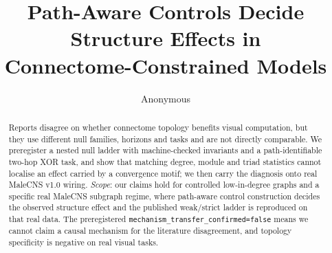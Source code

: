 \documentclass[10pt,twocolumn,letterpaper]{article}
\title{Path-Aware Controls Decide Structure Effects in\\ Connectome-Constrained Models}
\author{Anonymous}
\begin{document}
\maketitle

\begin{abstract}
Reports disagree on whether connectome topology benefits visual computation,
but they use different null families, horizons and tasks and are not directly
comparable. We preregister a nested null ladder with machine-checked invariants
and a path-identifiable two-hop XOR task, and show that matching degree, module
and triad statistics cannot localise an effect carried by a convergence motif;
we then carry the diagnosis onto real MaleCNS v1.0 wiring. \emph{Scope}: our
claims hold for controlled low-in-degree graphs and a specific real MaleCNS
subgraph regime, where path-aware control construction decides the observed
structure effect and the published weak/strict ladder is reproduced on that
real data. The preregistered \texttt{mechanism\_transfer\_confirmed=false}
means we cannot claim a causal mechanism for the literature disagreement, and
topology specificity is negative on real visual tasks.


\end{abstract}
\end{document}

